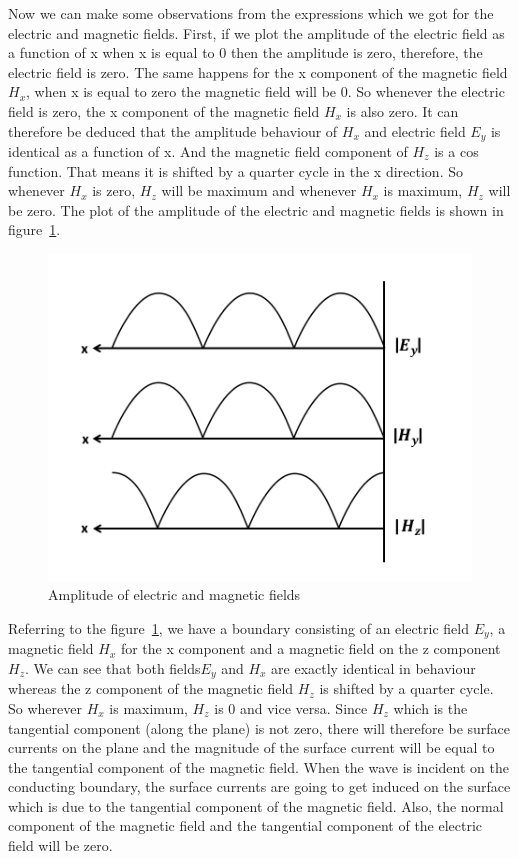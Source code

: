 Now we can make some observations from the expressions which we got for the electric and magnetic fields. First, if we plot the amplitude of the electric field as a function of x when x is equal to 0 then the amplitude is zero, therefore, the electric field is zero. The same happens for the x component of the magnetic field $H_x$, when x is equal to zero the magnetic field will be 0. So whenever the electric field is zero, the x component of the magnetic field $H_x$ is also zero. It can therefore be deduced that the amplitude behaviour of $H_x$ and electric field $E_y$ is identical as a function of x. And the magnetic field component of $H_z$ is a cos function. That means it is shifted by a quarter cycle in the x direction. So whenever $H_x$ is zero, $H_z$ will be maximum and whenever $H_x$ is maximum, $H_z$ will be zero. The plot of the amplitude of the electric and magnetic fields is shown in figure~\ref{fig:amplitude}.
\begin{figure}[h]
\centering
\includegraphics[width=1\linewidth]{./graphics/amplitude_of_electric_and_magnetic_fields.png}
\caption{Amplitude of electric and magnetic fields}
\label{fig:amplitude}
\end{figure}

Referring to the figure~\ref{fig:amplitude}, we have a boundary consisting of an electric field $E_y$, a magnetic field $H_x$ for the x component and a magnetic field on the z component $H_z$. We can see that both fields$ E_y$ and $H_x$ are exactly identical in behaviour whereas the z component of the magnetic field $H_z$ is shifted by a quarter cycle. So wherever $H_x$ is maximum, $H_z$ is 0 and vice versa. Since $H_z$ which is the tangential component (along the plane) is not zero, there will therefore be surface currents on the plane and the magnitude of the surface current will be equal to the tangential component of the magnetic field. When the wave is incident on the conducting boundary, the surface currents are going to get induced on the surface which is due to the tangential component of the magnetic field. Also, the normal component of the magnetic field and the tangential component of the electric field will be zero.


